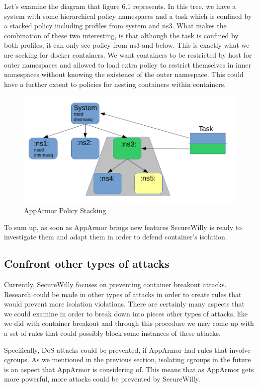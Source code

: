 Let's examine the diagram that figure 6.1 represents. In this tree, we have a system with some hierarchical policy namespaces and a task which is confined by a stacked policy including profiles from system and ns3. What makes the combination of these two interesting, is that although the task is confined by both profiles, it can only see policy from ns3 and below. This is exactly what we are seeking for docker containers. We want containers to be restricted by host for outer namespaces and allowed to load extra policy to restrict themselves in inner namespaces without knowing the existence of the outer namespace.
This could have a further extent to policies for nesting containers within containers.

\begin{figure}[h!]
  \centering
   \includegraphics[width=0.9\linewidth]{../figures/policystacking1.png}
   \caption{AppArmor Policy Stacking}
\end{figure}
\hfill\break

To sum up, as soon as AppArmor brings new features SecureWilly is ready to investigate them and adapt them in order to defend container's isolation.

\subsection{Confront other types of attacks}
Currently, SecureWilly focuses on preventing container breakout attacks. Research could be made in other types of attacks in order to create rules that would prevent more isolation violations. There are certainly many aspects that we could examine in order to break down into pieces other types of attacks, like we did with container breakout and through this procedure we may come up with a set of rules that could possibly block some instances of these attacks.

Specifically, DoS attacks could be prevented, if AppArmor had rules that involve cgroups. As we mentioned in the previous section, isolating cgroups in the future is an aspect that AppArmor is considering of. This means that as AppArmor gets more powerful, more attacks could be prevented by SecureWilly.

